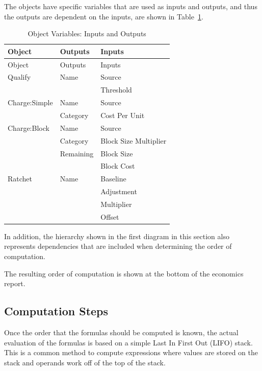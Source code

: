 The objects have specific variables that are used as inputs and outputs, and thus the outputs are dependent on the inputs, are shown in Table~\ref{table:object-variables-input-output}.

\textbf{\emph{}}

\begin{longtable}[c]{@{}lll@{}}
\caption{Object Variables: Inputs and Outputs \label{table:object-variables-input-output}} \tabularnewline
\toprule 
Object & Outputs & Inputs \tabularnewline
\midrule
\endfirsthead

\toprule 
Object & Outputs & Inputs \tabularnewline
\midrule
\endhead

Qualify & Name & Source \tabularnewline
~ & ~ & Threshold \tabularnewline
Charge:Simple & Name & Source \tabularnewline
~ & Category & Cost Per Unit \tabularnewline
Charge:Block & Name & Source \tabularnewline
~ & Category & Block Size Multiplier \tabularnewline
~ & Remaining & Block Size \tabularnewline
~ & ~ & Block Cost \tabularnewline
Ratchet & Name & Baseline \tabularnewline
~ & ~ & Adjustment \tabularnewline
~ & ~ & Multiplier \tabularnewline
~ & ~ & Offset \tabularnewline
\bottomrule
\end{longtable}

In addition, the hierarchy shown in the first diagram in this section also represents dependencies that are included when determining the order of computation.

The resulting order of computation is shown at the bottom of the economics report.

\subsection{Computation Steps}\label{computation-steps}

Once the order that the formulas should be computed is known, the actual evaluation of the formulas is based on a simple Last In First Out (LIFO) stack.~ This is a common method to compute expressions where values are stored on the stack and operands work off of the top of the stack.
